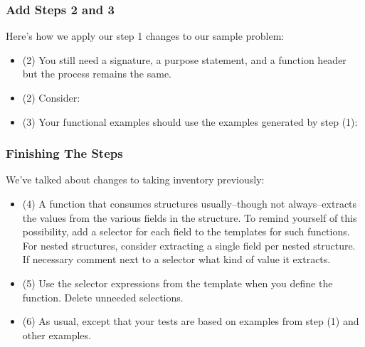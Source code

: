 \documentclass{beamer}
\begin{document}

\begin{frame}
  \frametitle{Add Steps 2 and 3}
  Here's how we apply our step 1 changes to our sample problem:
  \stepOneStructs
  \begin{itemize}
  \item<2-> (2) You still need a signature, a purpose statement, and a function header but the process remains the same. 
  \item<3-> (2) Consider:
    \ThreeDDistanceHeader
  \item<4-> (3) Your functional examples should use the examples generated by
    step (1):
    \ThreeDDistanceExamples    
  \end{itemize}
\end{frame}

\begin{frame}
  \frametitle{Finishing The Steps}
  We've talked about changes to taking inventory previously:
  \begin{itemize}
  \item<2-> (4) A function that consumes structures usually--though not always--extracts the values from the various fields in the structure. To remind yourself of this possibility, add a selector for each field to the templates for such functions.
    For nested structures, consider extracting a single field per nested structure.
    If necessary comment next to a selector what kind of value it extracts.
  \item<3-> (5) Use the selector expressions from the template when you define the function. Delete unneeded selections.
  \item<4-> (6) As usual, except that your tests are based on examples from step
    (1) and other examples.
  \end{itemize}
\end{frame}

\end{document}
